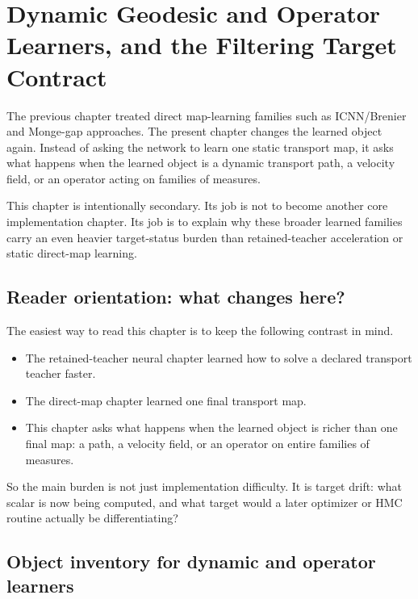 \chapter{Dynamic Geodesic and Operator Learners, and the Filtering Target Contract}
\label{ch:bf-neural-ot-dynamic-target-contract}

The previous chapter treated direct map-learning families such as ICNN/Brenier and
Monge-gap approaches.  The present chapter changes the learned object again.
Instead of asking the network to learn one static transport map, it asks what
happens when the learned object is a dynamic transport path, a velocity field, or
an operator acting on families of measures.

This chapter is intentionally secondary.  Its job is not to become another core
implementation chapter.  Its job is to explain why these broader learned families
carry an even heavier target-status burden than retained-teacher acceleration or
static direct-map learning.

\section{Reader orientation: what changes here?}
\label{sec:bf-neural-ot-dynamic-orientation}

The easiest way to read this chapter is to keep the following contrast in mind.

\begin{itemize}
  \item The retained-teacher neural chapter learned how to solve a declared
  transport teacher faster.
  \item The direct-map chapter learned one final transport map.
  \item This chapter asks what happens when the learned object is richer than one
  final map: a path, a velocity field, or an operator on entire families of
  measures.
\end{itemize}

So the main burden is not just implementation difficulty.  It is target drift:
what scalar is now being computed, and what target would a later optimizer or HMC
routine actually be differentiating?

\section{Object inventory for dynamic and operator learners}
\label{sec:bf-neural-ot-dynamic-object}

